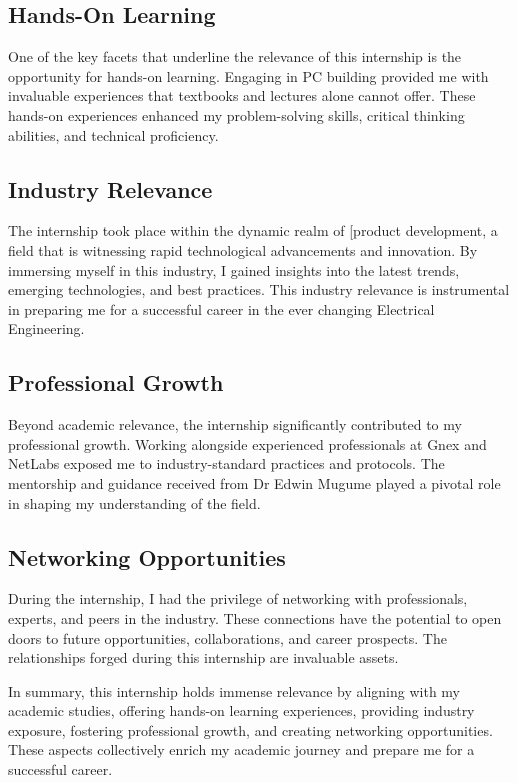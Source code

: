 \subsection{Hands-On Learning}

One of the key facets that underline the relevance of this internship is the opportunity for hands-on learning. Engaging in PC building provided me with invaluable experiences that textbooks and lectures alone cannot offer. These hands-on experiences enhanced my problem-solving skills, critical thinking abilities, and technical proficiency.

\subsection{Industry Relevance}

The internship took place within the dynamic realm of [product development, a field that is witnessing rapid technological advancements and innovation. By immersing myself in this industry, I gained insights into the latest trends, emerging technologies, and best practices. This industry relevance is instrumental in preparing me for a successful career in the ever changing Electrical Engineering.

\subsection{Professional Growth}

Beyond academic relevance, the internship significantly contributed to my professional growth. Working alongside experienced professionals at Gnex and NetLabs exposed me to industry-standard practices and protocols. The mentorship and guidance received from Dr Edwin Mugume played a pivotal role in shaping my understanding of the field.

\subsection{Networking Opportunities}

During the internship, I had the privilege of networking with professionals, experts, and peers in the industry. These connections have the potential to open doors to future opportunities, collaborations, and career prospects. The relationships forged during this internship are invaluable assets.

In summary, this internship holds immense relevance by aligning with my academic studies, offering hands-on learning experiences, providing industry exposure, fostering professional growth, and creating networking opportunities. These aspects collectively enrich my academic journey and prepare me for a successful career.

